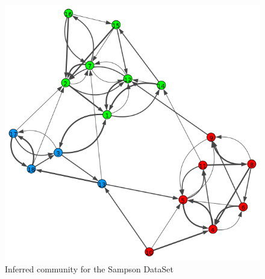 \documentclass[12pt]{ociamthesis}  %
\begin{document}
	
	\begin{figure}
		\centering
		\includegraphics[width=\textwidth,height=\textheight,keepaspectratio]{OptimizationPlotSam}
		\caption{Inferred community for the Sampson DataSet}
		\label{label-image4}
	\end{figure}
	
	
	
\end{document}
